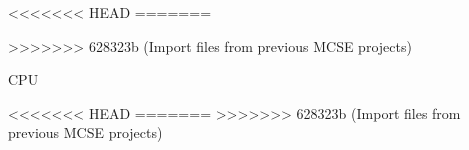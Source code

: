 \documentclass[]{article}
\begin{document}


\tableofcontents

\vspace{1cm}
\listoffigures

\vspace{1cm}
\listoftables




<<<<<<< HEAD
%
=======

>>>>>>> 628323b (Import files from previous MCSE projects)








\newpage
\gls{CPU}
\printunsrtglossary[type=acronym]


\newpage
<<<<<<< HEAD
=======
\cite{rm_L0}
>>>>>>> 628323b (Import files from previous MCSE projects)
{}


\newpage

\end{document}
